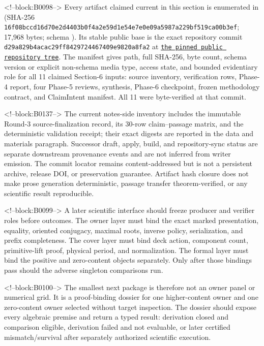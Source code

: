 \documentclass[11pt]{article}
\begin{document}
<!--block:B0098-->
\begingroup\sloppy
Every artifact claimed current in this section is enumerated in
 (SHA-256
\texttt{16f08bcc\allowbreak{}d16d70e2\allowbreak{}d4403b0f\allowbreak{}4a2e59d1\allowbreak{}e54e7e0e\allowbreak{}09a5987a\allowbreak{}229bf519\allowbreak{}ca00b3ef}; 17,968 bytes; schema
).  Its stable public
base is the exact repository commit
\texttt{d29a829b\allowbreak{}4acac29f\allowbreak{}f8429724\allowbreak{}467409e9\allowbreak{}820a8fa2} at
\href{https://github.com/maris205/hilbert-polya-structure/tree/d29a829b4acac29ff8429724467409e9820a8fa2/flow_systems/papers/32-homology-cover-renormalization-uniformity}{\texttt{the pinned public repository tree}}.
The manifest gives path, full SHA-256, byte count, schema version or explicit
non-schema media type, access state, and bounded evidentiary role for all 11
claimed Section-6 inputs: source inventory, verification rows, Phase-4 report,
four Phase-5 reviews, synthesis, Phase-6 checkpoint, frozen methodology
contract, and ClaimIntent manifest.  All 11 were byte-verified at that commit.

<!--block:B0137-->
The current notes-side inventory includes the immutable
Round-3 source-finalization record, its 30-row claim--passage matrix, and the
deterministic validation receipt; their exact digests are reported in the data and
materials paragraph. Successor draft, apply, build, and repository-sync status are
separate downstream provenance events and are not inferred from writer emission.
The commit locator remains content-addressed but is not a persistent archive,
release DOI, or preservation guarantee. Artifact hash closure does not make prose
generation deterministic, passage transfer theorem-verified, or any scientific
result reproducible.
\par\endgroup

<!--block:B0099-->
A later scientific interface should freeze producer and verifier roles
before outcomes. The owner layer must bind the exact marked
presentation, equality, oriented conjugacy, maximal roots, inverse
policy, serialization, and prefix completeness. The cover layer must
bind deck action, component count, primitive-lift proof, physical
period, and normalization. The formal layer must bind the positive and
zero-content objects separately. Only after those bindings pass should
the adverse singleton comparisons run.

<!--block:B0100-->
The smallest next package is therefore not an owner panel or numerical
grid. It is a proof-binding dossier for one higher-content owner and one
zero-content owner selected without target inspection. The dossier
should expose every algebraic premise and return a typed result:
derivation closed and comparison eligible, derivation failed and not
evaluable, or later certified mismatch/survival after separately
authorized scientific execution.
\end{document}

